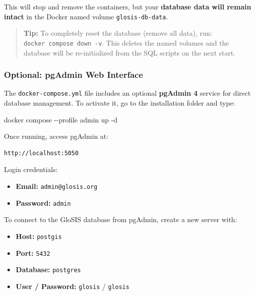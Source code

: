 \documentclass[
  10pt,
  b5paper,
  oneside]{book}
\newenvironment{Shaded}{\begin{snugshade}}{\end{snugshade}}
\newcommand{\AttributeTok}[1]{\textcolor[rgb]{0.13,0.29,0.53}{#1}}
\newcommand{\ExtensionTok}[1]{#1}
\newcommand{\NormalTok}[1]{#1}
\providecommand{\tightlist}{%
  \setlength{\itemsep}{0pt}\setlength{\parskip}{0pt}}
\begin{document}
This will stop and remove the containers, but your \textbf{database data will remain intact} in the Docker named volume \texttt{glosis-db-data}.

\begin{quote}
\textbf{Tip:} To completely reset the database (remove all data), run: \texttt{docker\ compose\ down\ -v}. This deletes the named volumes and the database will be re-initialized from the SQL scripts on the next start.
\end{quote}

\subsubsection{Optional: pgAdmin Web Interface}\label{pgadmin}

The \texttt{docker-compose.yml} file includes an optional \textbf{pgAdmin 4} service for direct database management. To activate it, go to the installation folder and type:

\begin{Shaded}
\begin{Highlighting}[]
\ExtensionTok{docker}\NormalTok{ compose }\AttributeTok{{-}{-}profile}\NormalTok{ admin up }\AttributeTok{{-}d}
\end{Highlighting}
\end{Shaded}

Once running, access pgAdmin at:

\begin{verbatim}
http://localhost:5050
\end{verbatim}

Login credentials:

\begin{itemize}
\tightlist
\item
  \textbf{Email:} \texttt{admin@glosis.org}
\item
  \textbf{Password:} \texttt{admin}
\end{itemize}

To connect to the GloSIS database from pgAdmin, create a new server with:

\begin{itemize}
\tightlist
\item
  \textbf{Host:} \texttt{postgis}
\item
  \textbf{Port:} \texttt{5432}
\item
  \textbf{Database:} \texttt{postgres}
\item
  \textbf{User / Password:} \texttt{glosis} / \texttt{glosis}
\end{itemize}
\end{document}
